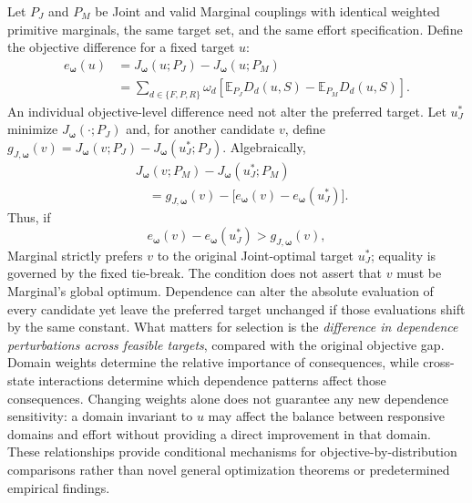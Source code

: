 Let $P_J$ and $P_M$ be Joint and valid Marginal couplings with identical weighted primitive marginals, the same target set, and the same effort specification. Define the objective difference for a fixed target $u$:
\begin{equation}
\begin{aligned}
e_{\boldsymbol\omega}(u)
&=J_{\boldsymbol\omega}(u;P_J)
-J_{\boldsymbol\omega}(u;P_M)\\
&=\sum_{d\in\{F,P,R\}}\omega_d
\left[\mathbb E_{P_J}D_d(u,S)
-\mathbb E_{P_M}D_d(u,S)\right].
\end{aligned}
\label{eq:dependence_objective_difference}
\end{equation}
An individual objective-level difference need not alter the preferred target. Let $u_J^*$ minimize $J_{\boldsymbol\omega}(\cdot;P_J)$ and, for another candidate $v$, define $g_{J,\boldsymbol\omega}(v)=J_{\boldsymbol\omega}(v;P_J)-J_{\boldsymbol\omega}(u_J^*;P_J)$. Algebraically,
\begin{equation}
\begin{aligned}
&J_{\boldsymbol\omega}(v;P_M)
-J_{\boldsymbol\omega}(u_J^*;P_M)\\
&\quad=g_{J,\boldsymbol\omega}(v)
-\bigl[e_{\boldsymbol\omega}(v)-e_{\boldsymbol\omega}(u_J^*)\bigr].
\end{aligned}
\label{eq:relative_dependence_perturbation}
\end{equation}
Thus, if
\[
e_{\boldsymbol\omega}(v)-e_{\boldsymbol\omega}(u_J^*)
>g_{J,\boldsymbol\omega}(v),
\]
Marginal strictly prefers $v$ to the original Joint-optimal target $u_J^*$; equality is governed by the fixed tie-break. The condition does not assert that $v$ must be Marginal's global optimum. Dependence can alter the absolute evaluation of every candidate yet leave the preferred target unchanged if those evaluations shift by the same constant. What matters for selection is the \emph{difference in dependence perturbations across feasible targets}, compared with the original objective gap. Domain weights determine the relative importance of consequences, while cross-state interactions determine which dependence patterns affect those consequences. Changing weights alone does not guarantee any new dependence sensitivity: a domain invariant to $u$ may affect the balance between responsive domains and effort without providing a direct improvement in that domain. These relationships provide conditional mechanisms for objective-by-distribution comparisons rather than novel general optimization theorems or predetermined empirical findings.

